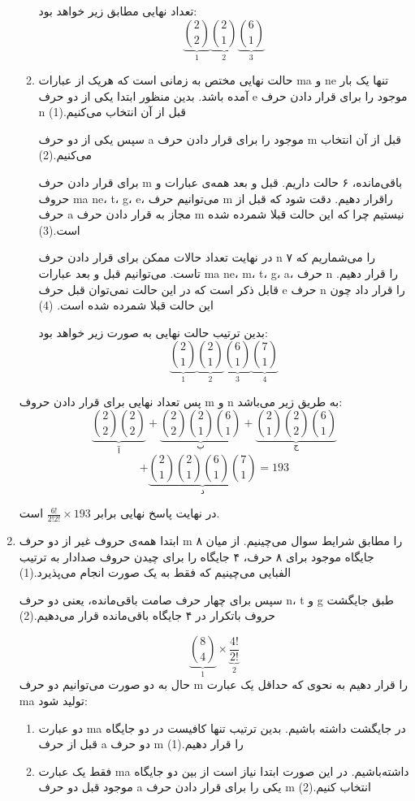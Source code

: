 \begin{enumerate}
\begin{enumerate}
      تعداد نهایی مطابق زیر خواهد بود:
      $$\underbrace{{2\choose 2}}_{1}\underbrace{{2 \choose 1}}_{2}\underbrace{{6\choose 1}}_{3}$$
      \item
      حالت نهایی مختص به زمانی است که هریک از عبارات ma و ne تنها یک بار آمده باشد.
      بدین منظور ابتدا یکی از دو حرف e موجود را برای قرار دادن حرف n قبل از آن انتخاب می‌کنیم.(1)
      
      سپس یکی از دو حرف a موجود را برای قرار دادن حرف m قبل از آن انتخاب می‌کنیم.(2)
      
      برای قرار دادن حرف m باقی‌مانده، ۶ حالت داریم.
      قبل و بعد همه‌ی عبارات و حروف 
      ma 
      ne، t، g، e،
      می‌توانیم حرف m راقرار دهیم.
      دقت شود که قبل از حرف a مجاز به قرار دادن حرف m نیستیم چرا که این حالت قبلا شمرده شده است.(3)
      
      در نهایت تعداد حالات ممکن برای قرار دادن حرف n را
      می‌شماریم که ۷ تاست. می‌توانیم قبل و بعد عبارات
      ma
      ne،
      m،
      t، g، a،
      حرف n را قرار دهیم.
      قابل ذکر است که در این حالت نمی‌توان قبل حرف e
      حرف n را قرار داد چون این حالت قبلا شمرده شده است.
      (4)
      
      بدین ترتیب حالت نهایی به صورت زیر خواهد بود:
      $$\underbrace{{2\choose 1}}_{1}\underbrace{{2\choose 1}}_{2}\underbrace{{6\choose 1}}_{3}\underbrace{{7\choose 1}}_{4}$$
    \end{enumerate}
    پس تعداد نهایی برای قرار دادن حروف m و n به طریق زیر می‌باشد:
    $$\underbrace{{2 \choose 2}{2 \choose 2}}_{\text{آ}} + \underbrace{{2\choose 2}{2 \choose 1}{6\choose 1}}_{\text{ب}} + \underbrace{{2\choose 1}{2\choose 2}{6\choose 1}}_{\text{ج}}$$
    $$+ \underbrace{{2\choose 1}{2\choose 1}{6\choose 1}{7\choose 1}}_{\text{د}} = 193$$

    در نهایت پاسخ نهایی برابر $\frac{6!}{2!2!} \times 193$ است.
    \item
    ابتدا همه‌ی حروف غیر از دو حرف m را مطابق شرایط سوال می‌چینیم.
    از میان ۸ جایگاه موجود برای ۸ حرف، ۴ جایگاه را برای چیدن حروف صدادار به ترتیب الفبایی می‌چینیم که فقط به یک صورت انجام می‌پذیرد.(1)
    
    سپس برای چهار حرف صامت باقی‌مانده، یعنی دو حرف n،
    t و g
    طبق جایگشت حروف باتکرار در ۴ جایگاه باقی‌مانده قرار می‌دهیم.(2)
    
    $$\underbrace{{8\choose 4}}_{1} \times \underbrace{\frac{4!}{2!}}_{2}$$
    حال به دو صورت می‌توانیم دو حرف m را قرار دهیم به نحوی که حداقل یک عبارت 
    ma تولید شود:
    \begin{enumerate}
      \item 
      دو عبارت ma در جایگشت داشته باشیم. بدین ترتیب تنها کافیست در دو جایگاه قبل از حرف a دو حرف m را قرار دهیم.(1)
      \item
      فقط یک عبارت ma داشته‌باشیم. در این صورت ابتدا نیاز است از بین دو جایگاه موجود قبل دو حرف a یکی را برای قرار دادن حرف m انتخاب کنیم.(2)
      

\end{enumerate}
\end{enumerate}
